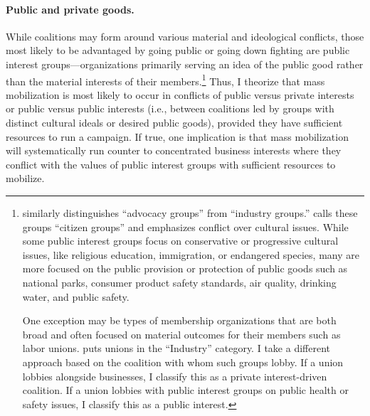 \begin{subhyp}

\paragraph{Public and private goods.} While coalitions may form around various material and ideological conflicts, those most likely to be advantaged by going public or going down fighting are public interest groups---organizations primarily serving an idea of the public good rather than the material interests of their members.\footnote{\citet{Potter2017} similarly distinguishes ``advocacy groups'' from ``industry groups.'' \citet{Berry1999} calls these groups ``citizen groups'' and emphasizes conflict over cultural issues. While some public interest groups focus on conservative or progressive cultural issues, like religious education, immigration, or endangered species, many are more focused on the public provision or protection of public goods such as national parks, consumer product safety standards, air quality, drinking water, and public safety.

One exception may be types of membership organizations that are both broad and often focused on material outcomes for their members such as labor unions. \citet{Potter2017} puts unions in the ``Industry'' category. I take a different approach based on the coalition with whom such groups lobby. If a union lobbies alongside businesses, I classify this as a private interest-driven coalition. If a union lobbies with public interest groups on public health or safety issues, I classify this as a public interest.} Thus, I theorize that mass mobilization is most likely to occur in conflicts of public versus private interests or public versus public interests (i.e., between coalitions led by groups with distinct cultural ideals or desired public goods), provided they have sufficient resources to run a campaign.
If true, one implication is that mass mobilization will systematically run counter to concentrated business interests where they conflict with the values of public interest groups with sufficient resources to mobilize.



\end{subhyp}
